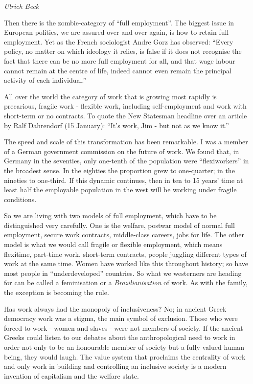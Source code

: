 \documentclass[
]{book}
\begin{document}
\emph{Ulrich Beck}

Then there is the zombie-category of ``full employment''. The biggest issue in European politics, we are assured over and over again, is how to retain full employment. Yet as the French sociologist Andre Gorz has observed: ``Every policy, no matter on which ideology it relies, is false if it does not recognise the fact that there can be no more full employment for all, and that wage labour cannot remain at the centre of life, indeed cannot even remain the principal activity of each individual.''

All over the world the category of work that is growing most rapidly is precarious, fragile work - flexible work, including self-employment and work with short-term or no contracts. To quote the New Statesman headline over an article by Ralf Dahrendorf (15 January): ``It's work, Jim - but not as we know it.''

The speed and scale of this transformation has been remarkable. I was a member of a German government commission on the future of work. We found that, in Germany in the seventies, only one-tenth of the population were ``flexiworkers'' in the broadest sense. In the eighties the proportion grew to one-quarter; in the nineties to one-third. If this dynamic continues, then in ten to 15 years' time at least half the employable population in the west will be working under fragile conditions.

So we are living with two models of full employment, which have to be distinguished very carefully. One is the welfare, postwar model of normal full employment, secure work contracts, middle-class careers, jobs for life. The other model is what we would call fragile or flexible employment, which means flexitime, part-time work, short-term contracts, people juggling different types of work at the same time. Women have worked like this throughout history; so have most people in ``underdeveloped'' countries. So what we westerners are heading for can be called a feminisation or a \emph{Brazilianisation} of work. As with the family, the exception is becoming the rule.

Has work always had the monopoly of inclusiveness? No; in ancient Greek democracy work was a stigma, the main symbol of exclusion. Those who were forced to work - women and slaves - were not members of society. If the ancient Greeks could listen to our debates about the anthropological need to work in order not only to be an honourable member of society but a fully valued human being, they would laugh. The value system that proclaims the centrality of work and only work in building and controlling an inclusive society is a modern invention of capitalism and the welfare state.
\end{document}
